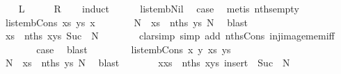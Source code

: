 \begin{isabellebody}
%
\isadelimproof
%
\endisadelimproof
%
\isatagproof
{}\isamarkupfalse%
\isanewline
\ \ \isamarkupfalse%
\ {\isacharquery}L\isanewline
\ \ \isamarkupfalse%
\ \isamarkupfalse%
\ {\isacharquery}R\isanewline
\ \ \isamarkupfalse%
\ {\isacharparenleft}induct{\isacharparenright}\isanewline
\ \ \ \ \isamarkupfalse%
\ list{\isacharunderscore}emb{\isacharunderscore}Nil\ \isamarkupfalse%
\ {\isacharquery}case\ \isamarkupfalse%
\ {\isacharparenleft}metis\ nths{\isacharunderscore}empty{\isacharparenright}\isanewline
\ \ \isamarkupfalse%
\isanewline
\ \ \ \ \isamarkupfalse%
\ {\isacharparenleft}list{\isacharunderscore}emb{\isacharunderscore}Cons\ xs\ ys\ x{\isacharparenright}\isanewline
\ \ \ \ \isamarkupfalse%
\ \isamarkupfalse%
\ N\ \ {\isachardoublequoteopen}xs\ {\isacharequal}\ nths\ ys\ N{\isachardoublequoteclose}\ \isamarkupfalse%
\ blast\isanewline
\ \ \ \ \isamarkupfalse%
\ \isamarkupfalse%
\ {\isachardoublequoteopen}xs\ {\isacharequal}\ nths\ {\isacharparenleft}x{\isacharhash}ys{\isacharparenright}\ {\isacharparenleft}Suc\ {\isacharbackquote}\ N{\isacharparenright}{\isachardoublequoteclose}\isanewline
\ \ \ \ \ \ \isamarkupfalse%
\ {\isacharparenleft}clarsimp\ simp\ add{\isacharcolon}\ nths{\isacharunderscore}Cons\ inj{\isacharunderscore}image{\isacharunderscore}mem{\isacharunderscore}iff{\isacharparenright}\isanewline
\ \ \ \ \isamarkupfalse%
\ \isamarkupfalse%
\ {\isacharquery}case\ \isamarkupfalse%
\ blast\isanewline
\ \ \isamarkupfalse%
\isanewline
\ \ \ \ \isamarkupfalse%
\ {\isacharparenleft}list{\isacharunderscore}emb{\isacharunderscore}Cons{}\ x\ y\ xs\ ys{\isacharparenright}\isanewline
\ \ \ \ \isamarkupfalse%
\ \isamarkupfalse%
\ N\ \ {\isachardoublequoteopen}xs\ {\isacharequal}\ nths\ ys\ N{\isachardoublequoteclose}\ \isamarkupfalse%
\ blast\isanewline
\ \ \ \ \isamarkupfalse%
\ \isamarkupfalse%
\ {\isachardoublequoteopen}x{\isacharhash}xs\ {\isacharequal}\ nths\ {\isacharparenleft}x{\isacharhash}ys{\isacharparenright}\ {\isacharparenleft}insert\ {}\ {\isacharparenleft}Suc\ {\isacharbackquote}\ N{\isacharparenright}{\isacharparenright}{\isachardoublequoteclose}\isanewline

\end{isabellebody}
